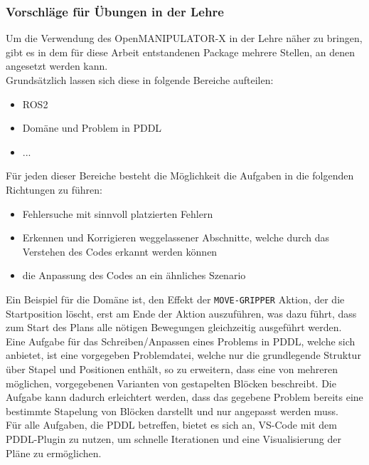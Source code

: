 \subsubsection{Vorschläge für Übungen in der Lehre}
Um die Verwendung des OpenMANIPULATOR-X in der Lehre näher zu bringen, gibt es in dem für diese Arbeit entstandenen Package mehrere Stellen, an denen angesetzt werden kann.\\
Grundsätzlich lassen sich diese in folgende Bereiche aufteilen:
\begin{itemize}
\item \ac{ROS2}
\item Domäne und Problem in PDDL
\item ...
\end{itemize}
Für jeden dieser Bereiche besteht die Möglichkeit die Aufgaben in die folgenden Richtungen zu führen:
\begin{itemize}
\item Fehlersuche mit sinnvoll platzierten Fehlern
\item Erkennen und Korrigieren weggelassener Abschnitte, welche durch das Verstehen des Codes erkannt werden können
\item die Anpassung des Codes an ein ähnliches Szenario
\end{itemize}
Ein Beispiel für die Domäne ist, den Effekt der \verb|MOVE-GRIPPER| Aktion, der die Startposition löscht, erst am Ende der Aktion auszuführen, was dazu führt, dass zum Start des Plans alle nötigen Bewegungen gleichzeitig ausgeführt werden.\\
Eine Aufgabe für das Schreiben/Anpassen eines Problems in PDDL, welche sich anbietet, ist eine vorgegeben Problemdatei, welche nur die grundlegende Struktur über Stapel und Positionen enthält, so zu erweitern, dass eine von mehreren möglichen, vorgegebenen Varianten von gestapelten Blöcken beschreibt.
Die Aufgabe kann dadurch erleichtert werden, dass das gegebene Problem bereits eine bestimmte Stapelung von Blöcken darstellt und nur angepasst werden muss.\\
Für alle Aufgaben, die PDDL betreffen, bietet es sich an, VS-Code mit dem PDDL-Plugin zu nutzen, um schnelle Iterationen und eine Visualisierung der Pläne zu ermöglichen.
